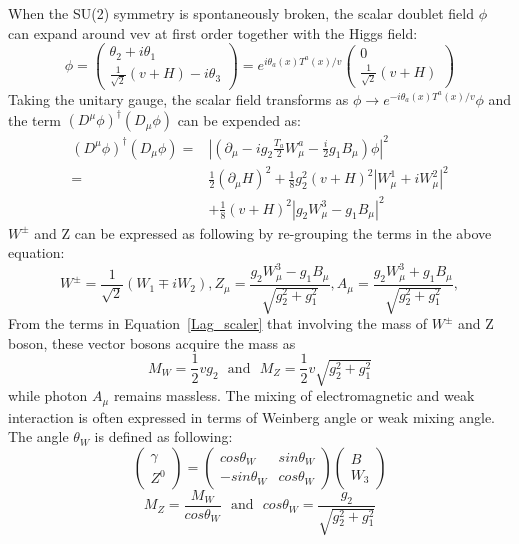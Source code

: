 When the SU(2) symmetry is spontaneously broken, the scalar doublet field $\phi$ can expand around vev at first order together with the Higgs field:
\begin{equation}\label{Higgs_vev_expansion}
\phi=
\begin{pmatrix}
\theta_{2}+i\theta_{1} \\
\frac{1}{\sqrt{2}}(v+H)-i\theta_{3}
\end{pmatrix}
=e^{i\theta_{a}(x)T^{a}(x)/v}
\begin{pmatrix}
0\\
\frac{1}{\sqrt{2}}(v+H)
\end{pmatrix}
\end{equation}
Taking the unitary gauge, the scalar field transforms as $\phi \to e^{-i\theta_{a}(x)T^{a}(x)/v}\phi$ and the term $(D^{\mu}\phi)^{\dagger}(D_{\mu}\phi)$ can be expended as:
\begin{equation}\label{Lag_scaler}
\begin{aligned}
(D^{\mu}\phi)^{\dagger}(D_{\mu}\phi)=&|(\partial_{\mu}-ig_{2}\frac{T_{a}}{2}W^{a}_{\mu}-\frac{i}{2}g_{1}B_{\mu})\phi|^{2}\\
                                                          =&\frac{1}{2}(\partial_{\mu}H)^{2}+\frac{1}{8}g^{2}_{2}(v+H)^{2}|W^{1}_{\mu}+iW^{2}_{\mu}|^{2}\\
                                                            &+\frac{1}{8}(v+H)^{2}|g_{2}W^{3}_{\mu}-g_{1}B_{\mu}|^{2}
\end{aligned}
\end{equation}
$W^{\pm}$ and Z can be expressed as following by re-grouping the terms in the above equation: 
\begin{equation}
W^{\pm}=\frac{1}{\sqrt{2}}(W_{1}\mp iW_{2}), Z_{\mu}=\frac{g_{2}W^{3}_{\mu}-g_{1}B_{\mu}}{\sqrt{g_{2}^{2}+g^{2}_{1}}},A_{\mu}=\frac{g_{2}W^{3}_{\mu}+g_{1}B_{\mu}}{\sqrt{g_{2}^{2}+g^{2}_{1}}},
\end{equation}
From the terms in Equation~\ref{Lag_scaler} that involving the mass of $W^{\pm}$ and Z boson, these vector bosons acquire the mass as
\begin{equation}
M_{W}=\frac{1}{2}vg_{2}~~~\textrm{and}~~~M_{Z}=\frac{1}{2}v\sqrt{g^{2}_{2}+g^{2}_{1}}
\end{equation}
while photon $A_{\mu}$ remains massless. The mixing of electromagnetic and weak interaction is often expressed in terms of Weinberg angle or weak mixing angle. The angle $\theta_{W}$ is defined as following:
\[
\begin{pmatrix}
\gamma    \\
Z^{0}
\end{pmatrix}
=
\begin{pmatrix}
cos\theta_{W}  & sin\theta_{W} \\
-sin\theta_{W}  & cos\theta_{W}
\end{pmatrix}
\begin{pmatrix}
B\\
W_{3}
\end{pmatrix}
\]
\begin{equation}
M_{Z}=\frac{M_{W}}{cos\theta_{W}}~~~ \textrm{and}~~~
cos\theta_{W}=\frac{g_{2}}{\sqrt{g_{2}^{2}+g_{1}^{2}}}
\end{equation}

